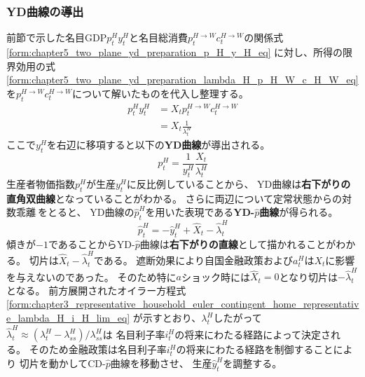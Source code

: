 \subsubsection{YD曲線の導出}
\label{sec:chapter5_two_plane_yd_derivation}
前節で示した名目GDP\(p_t^Hy_t^H\)と名目総消費\(p_t^{H\to W}c_t^{H\to W}\)の関係式
\eqref{form:chapter5_two_plane_yd_preparation_p_H_y_H_eq}
に対し、所得の限界効用の式
\eqref{form:chapter5_two_plane_yd_preparation_lambda_H_p_H_W_c_H_W_eq}
を\(p_t^{H\to W}c_t^{H\to W}\)について解いたものを代入し整理する。
\begin{equation}
\label{form:chapter5_two_plane_yd_derivation_p_H_y_H_eq}
    \begin{aligned}
        p_t^Hy_t^H
        &=X_tp_t^{H\to W}c_t^{H\to W} \\
        &=X_t\frac{1}{\lambda_t^H}
    \end{aligned}
\end{equation}
ここで\(y_t^H\)を右辺に移項すると以下の\textbf{YD曲線}が導出される。
\begin{equation}
\label{form:chapter5_two_plane_yd_derivation_p_H_eq}
    p_t^H=\frac{1}{y_t^H}\frac{X_t}{\lambda_t^H}
\end{equation}
生産者物価指数\(p_t^H\)が生産\(y_t^H\)に反比例していることから、
YD曲線は\textbf{右下がりの直角双曲線}となっていることがわかる。
さらに両辺について定常状態からの対数乖離\(\hat{\ }\)をとると、
YD曲線の\(\hat{p}_t^H\)を用いた表現である\textbf{YD-\(\hat{p}\)曲線}が得られる。
\begin{equation}
\label{form:chapter5_two_plane_yd_derivation_p_H_hat_eq}
    \hat{p}_t^H=-\hat{y}_t^H+\hat{X}_t-\hat{\lambda}_t^H
\end{equation}
傾きが\(-1\)であることからYD-\(\hat{p}\)曲線は\textbf{右下がりの直線}として描かれることがわかる。
切片は\(\hat{X}_t-\hat{\lambda}_t^H\)である。
遮断効果により自国金融政策および\(a_t^H\)は\(X_t\)に影響を与えないのであった。
そのため特に\(a\)ショック時には\(\hat{X}_t=0\)となり切片は\(-\hat{\lambda}_t^H\)となる。
前方展開されたオイラー方程式
\eqref{form:chapter3_representative_household_euler_contingent_home_representative_lambda_H_i_H_lim_eq}
が示すとおり、\(\lambda_t^H\)したがって
\(\hat{\lambda}_t^H\approx(\lambda_t^H-\lambda_{ss}^H)/\lambda_{ss}^H\)は
名目利子率\(i_t^H\)の将来にわたる経路によって決定される。
そのため金融政策は名目利子率\(i_t^H\)の将来にわたる経路を制御することにより
切片を動かしてCD-\(\hat{p}\)曲線を移動させ、
生産\(\hat{y}_t^H\)を調整する。